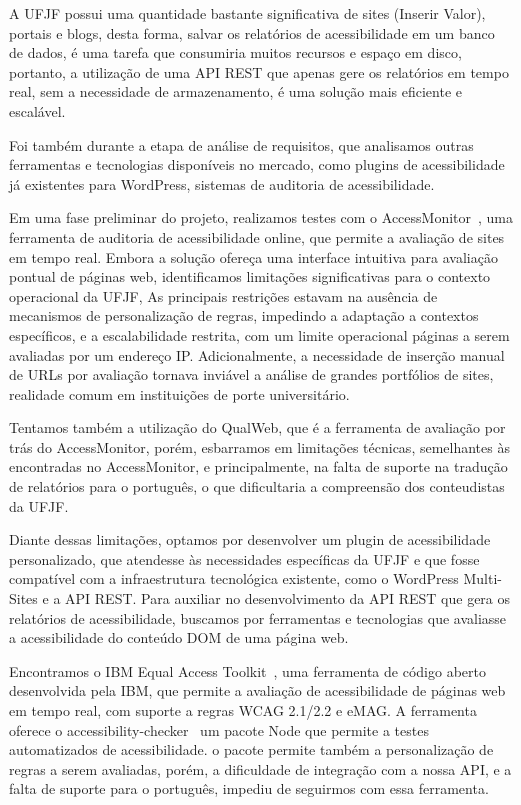 \documentclass[12pt]{article}
\begin{document}
A UFJF possui uma quantidade bastante significativa de sites (Inserir Valor), portais e blogs, desta
forma, salvar os relatórios de acessibilidade em um banco de dados, é uma tarefa que 
consumiria muitos recursos e espaço em disco, portanto, a utilização de uma API REST
que apenas gere os relatórios em tempo real, sem a necessidade de armazenamento, é 
uma solução mais eficiente e escalável.
 
Foi também durante a etapa de análise de requisitos, que analisamos 
outras ferramentas e tecnologias disponíveis no mercado, como plugins 
de acessibilidade já existentes para WordPress, sistemas de auditoria de acessibilidade.

Em uma fase preliminar do projeto, realizamos testes com o AccessMonitor~\autocite{AM}, 
uma ferramenta de auditoria de acessibilidade online, que permite a avaliação de 
sites em tempo real. Embora a solução ofereça uma interface intuitiva para 
avaliação pontual de páginas web, identificamos limitações significativas para o 
contexto operacional da UFJF, As principais restrições estavam na ausência de 
mecanismos de personalização de regras, impedindo a adaptação a contextos 
específicos, e a escalabilidade restrita, com um limite operacional páginas a 
serem avaliadas por um endereço IP\@. Adicionalmente, a necessidade de inserção 
manual de URLs por avaliação tornava inviável a análise de grandes portfólios de 
sites, realidade comum em instituições de porte universitário.

Tentamos também a utilização do QualWeb, que é a ferramenta de avaliação por
trás do AccessMonitor, porém, esbarramos em limitações técnicas, semelhantes
às encontradas no AccessMonitor, e principalmente, na falta de suporte na tradução
de relatórios para o português, o que dificultaria a compreensão dos conteudistas
da UFJF\@.

Diante dessas limitações, optamos por desenvolver um plugin de acessibilidade
personalizado, que atendesse às necessidades específicas da UFJF e que fosse
compatível com a infraestrutura tecnológica existente, como o WordPress Multi-Sites
e a API REST\@. Para auxiliar no desenvolvimento da API REST que gera os relatórios
de acessibilidade, buscamos por ferramentas e tecnologias que avaliasse a acessibilidade
do conteúdo DOM de uma página web.

Encontramos o IBM Equal Access Toolkit~\autocite{IBMa}, uma ferramenta de código aberto
desenvolvida pela IBM, que permite a avaliação de acessibilidade de páginas web
em tempo real, com suporte a regras WCAG 2.1/2.2 e eMAG\@. A ferramenta oferece
o accessibility-checker~\autocite{AC} um pacote Node que permite a testes automatizados de acessibilidade. o pacote permite também a personalização de regras a serem avaliadas,
porém, a dificuldade de integração com a nossa API, e a falta de suporte para o 
português, impediu de seguirmos com essa ferramenta.
\end{document}
